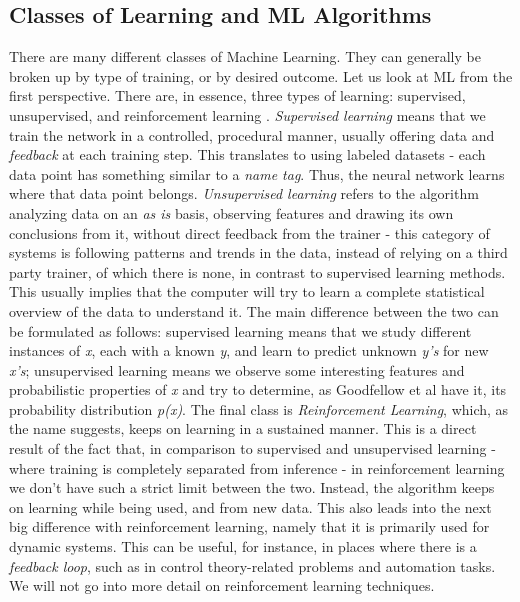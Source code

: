 \subsection{Classes of Learning and ML Algorithms}
There are many different classes of Machine Learning. They can generally be broken up by type of training, or by desired outcome. Let us look at ML from the first perspective. There are, in essence, three types of learning: supervised, unsupervised, and reinforcement learning \cite{DBLP:journals/corr/cs-AI-9605103}. \textit{Supervised learning} means that we train the network in a controlled, procedural manner, usually offering data and \textit{feedback} at each training step. This translates to using labeled datasets - each data point has something similar to a \textit{name tag}. Thus, the neural network learns where that data point belongs. \textit{Unsupervised learning} refers to the algorithm analyzing data on an \textit{as is} basis, observing features and drawing its own conclusions from it, without direct feedback from the trainer - this category of systems is following patterns and trends in the data, instead of relying on a third party trainer, of which there is none, in contrast to supervised learning methods. This usually implies that the computer will try to learn a complete statistical overview of the data to understand it. The main difference between the two can be formulated as follows: supervised learning means that we study different instances of \textit{x}, each with a known \textit{y}, and learn to predict unknown \textit{y's} for new \textit{x's}; unsupervised learning means we observe some interesting features and probabilistic properties of \textit{x} and try to determine, as Goodfellow et al have it, its probability distribution \textit{p(x)}. The final class is \textit{Reinforcement Learning}, which, as the name suggests, keeps on learning in a sustained manner. This is a direct result of the fact that, in comparison to supervised and unsupervised learning - where training is completely separated from inference - in reinforcement learning we don't have such a strict limit between the two. Instead, the algorithm keeps on learning while being used, and from new data. This also leads into the next big difference with reinforcement learning, namely that it is primarily used for dynamic systems. This can be useful, for instance, in places where there is a \textit{feedback loop}, such as in control theory-related problems and automation tasks. We will not go into more detail on reinforcement learning techniques. \par

